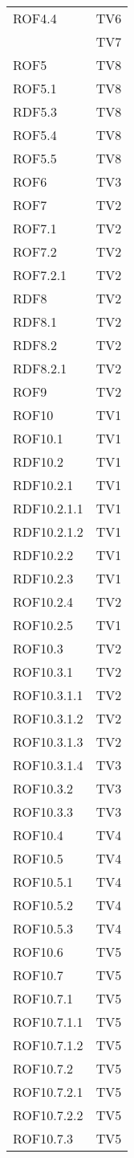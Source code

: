 \begin{center}
\begin{longtable}{|p{7cm}|p{7cm}|}
\midrule
ROF4.4 & TV6\\ & TV7\\
\midrule
ROF5 & TV8\\
\midrule
ROF5.1 & TV8\\
\midrule
RDF5.3 & TV8\\
\midrule
ROF5.4 & TV8\\
\midrule
ROF5.5 & TV8\\
\midrule
ROF6 & TV3\\
\midrule
ROF7 & TV2\\
\midrule
ROF7.1 & TV2\\
\midrule
ROF7.2 & TV2\\
\midrule
ROF7.2.1 & TV2\\
\midrule
RDF8 & TV2\\
\midrule
RDF8.1 & TV2\\
\midrule
RDF8.2 & TV2\\
\midrule
RDF8.2.1 & TV2\\
\midrule
ROF9 & TV2\\
\midrule
ROF10 & TV1\\
\midrule
ROF10.1 & TV1\\
\midrule
RDF10.2 & TV1\\
\midrule
RDF10.2.1 & TV1\\
\midrule
RDF10.2.1.1 & TV1\\
\midrule
RDF10.2.1.2 & TV1\\
\midrule
RDF10.2.2 & TV1\\
\midrule
RDF10.2.3 & TV1\\
\midrule
ROF10.2.4 & TV2\\
\midrule
ROF10.2.5 & TV1\\
\midrule
ROF10.3 & TV2\\
\midrule
ROF10.3.1 & TV2\\
\midrule
ROF10.3.1.1 & TV2\\
\midrule
ROF10.3.1.2 & TV2\\
\midrule
ROF10.3.1.3 & TV2\\
\midrule
ROF10.3.1.4 & TV3\\
\midrule
ROF10.3.2 & TV3\\
\midrule
ROF10.3.3 & TV3\\
\midrule
ROF10.4 & TV4\\
\midrule
ROF10.5 & TV4\\
\midrule
ROF10.5.1 & TV4\\
\midrule
ROF10.5.2 & TV4\\
\midrule
ROF10.5.3 & TV4\\
\midrule
ROF10.6 & TV5\\
\midrule
ROF10.7 & TV5\\
\midrule
ROF10.7.1 & TV5\\
\midrule
ROF10.7.1.1 & TV5\\
\midrule
ROF10.7.1.2 & TV5\\
\midrule
ROF10.7.2 & TV5\\
\midrule
ROF10.7.2.1 & TV5\\
\midrule
ROF10.7.2.2 & TV5\\
\midrule
ROF10.7.3 & TV5\\


\end{longtable}
\end{center}
